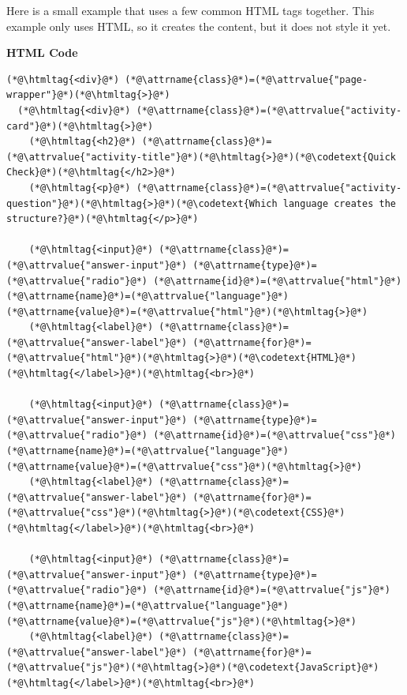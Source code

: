 \documentclass{article}
\begin{document}
\vspace{0.4cm}

Here is a small example that uses a few common HTML tags together.
This example only uses HTML, so it creates the content, but it does not style it yet.

\vspace{0.2cm}

\noindent
\begin{minipage}[t]{0.52\textwidth}
  \textbf{\Bitter\textcolor{naranja}{HTML Code}}

  \vspace{0.15cm}

  \begin{lstlisting}
(*@\htmltag{<div}@*) (*@\attrname{class}@*)=(*@\attrvalue{"page-wrapper"}@*)(*@\htmltag{>}@*)
  (*@\htmltag{<div}@*) (*@\attrname{class}@*)=(*@\attrvalue{"activity-card"}@*)(*@\htmltag{>}@*)
    (*@\htmltag{<h2}@*) (*@\attrname{class}@*)=(*@\attrvalue{"activity-title"}@*)(*@\htmltag{>}@*)(*@\codetext{Quick Check}@*)(*@\htmltag{</h2>}@*)
    (*@\htmltag{<p}@*) (*@\attrname{class}@*)=(*@\attrvalue{"activity-question"}@*)(*@\htmltag{>}@*)(*@\codetext{Which language creates the structure?}@*)(*@\htmltag{</p>}@*)

    (*@\htmltag{<input}@*) (*@\attrname{class}@*)=(*@\attrvalue{"answer-input"}@*) (*@\attrname{type}@*)=(*@\attrvalue{"radio"}@*) (*@\attrname{id}@*)=(*@\attrvalue{"html"}@*) (*@\attrname{name}@*)=(*@\attrvalue{"language"}@*) (*@\attrname{value}@*)=(*@\attrvalue{"html"}@*)(*@\htmltag{>}@*)
    (*@\htmltag{<label}@*) (*@\attrname{class}@*)=(*@\attrvalue{"answer-label"}@*) (*@\attrname{for}@*)=(*@\attrvalue{"html"}@*)(*@\htmltag{>}@*)(*@\codetext{HTML}@*)(*@\htmltag{</label>}@*)(*@\htmltag{<br>}@*)

    (*@\htmltag{<input}@*) (*@\attrname{class}@*)=(*@\attrvalue{"answer-input"}@*) (*@\attrname{type}@*)=(*@\attrvalue{"radio"}@*) (*@\attrname{id}@*)=(*@\attrvalue{"css"}@*) (*@\attrname{name}@*)=(*@\attrvalue{"language"}@*) (*@\attrname{value}@*)=(*@\attrvalue{"css"}@*)(*@\htmltag{>}@*)
    (*@\htmltag{<label}@*) (*@\attrname{class}@*)=(*@\attrvalue{"answer-label"}@*) (*@\attrname{for}@*)=(*@\attrvalue{"css"}@*)(*@\htmltag{>}@*)(*@\codetext{CSS}@*)(*@\htmltag{</label>}@*)(*@\htmltag{<br>}@*)

    (*@\htmltag{<input}@*) (*@\attrname{class}@*)=(*@\attrvalue{"answer-input"}@*) (*@\attrname{type}@*)=(*@\attrvalue{"radio"}@*) (*@\attrname{id}@*)=(*@\attrvalue{"js"}@*) (*@\attrname{name}@*)=(*@\attrvalue{"language"}@*) (*@\attrname{value}@*)=(*@\attrvalue{"js"}@*)(*@\htmltag{>}@*)
    (*@\htmltag{<label}@*) (*@\attrname{class}@*)=(*@\attrvalue{"answer-label"}@*) (*@\attrname{for}@*)=(*@\attrvalue{"js"}@*)(*@\htmltag{>}@*)(*@\codetext{JavaScript}@*)(*@\htmltag{</label>}@*)(*@\htmltag{<br>}@*)


\end{lstlisting}
\end{minipage}
\end{document}
